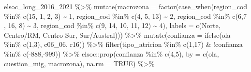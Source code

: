 \documentclass[
  12pt,
]{book}
\newenvironment{Shaded}{\begin{snugshade}}{\end{snugshade}}
\newcommand{\AttributeTok}[1]{\textcolor[rgb]{0.77,0.63,0.00}{#1}}
\newcommand{\ConstantTok}[1]{\textcolor[rgb]{0.00,0.00,0.00}{#1}}
\newcommand{\DecValTok}[1]{\textcolor[rgb]{0.00,0.00,0.81}{#1}}
\newcommand{\FunctionTok}[1]{\textcolor[rgb]{0.00,0.00,0.00}{#1}}
\newcommand{\NormalTok}[1]{#1}
\newcommand{\SpecialCharTok}[1]{\textcolor[rgb]{0.00,0.00,0.00}{#1}}
\newcommand{\StringTok}[1]{\textcolor[rgb]{0.31,0.60,0.02}{#1}}
\begin{document}
\begin{Shaded}
\begin{Highlighting}[]
\NormalTok{elsoc\_long\_2016\_2021 }\SpecialCharTok{\%\textgreater{}\%} 
  \FunctionTok{mutate}\NormalTok{(}\AttributeTok{macrozona =} \FunctionTok{factor}\NormalTok{(}\FunctionTok{case\_when}\NormalTok{(region\_cod }\SpecialCharTok{\%in\%} \FunctionTok{c}\NormalTok{(}\DecValTok{15}\NormalTok{, }\DecValTok{1}\NormalTok{, }\DecValTok{2}\NormalTok{, }\DecValTok{3}\NormalTok{) }\SpecialCharTok{\textasciitilde{}} \DecValTok{1}\NormalTok{,}
\NormalTok{                               region\_cod }\SpecialCharTok{\%in\%} \FunctionTok{c}\NormalTok{(}\DecValTok{4}\NormalTok{, }\DecValTok{5}\NormalTok{, }\DecValTok{13}\NormalTok{) }\SpecialCharTok{\textasciitilde{}} \DecValTok{2}\NormalTok{,}
\NormalTok{                               region\_cod }\SpecialCharTok{\%in\%} \FunctionTok{c}\NormalTok{(}\DecValTok{6}\NormalTok{,}\DecValTok{7}\NormalTok{ , }\DecValTok{16}\NormalTok{, }\DecValTok{8}\NormalTok{) }\SpecialCharTok{\textasciitilde{}} \DecValTok{3}\NormalTok{,}
\NormalTok{                               region\_cod }\SpecialCharTok{\%in\%} \FunctionTok{c}\NormalTok{(}\DecValTok{9}\NormalTok{, }\DecValTok{14}\NormalTok{, }\DecValTok{10}\NormalTok{, }\DecValTok{11}\NormalTok{, }\DecValTok{12}\NormalTok{) }\SpecialCharTok{\textasciitilde{}} \DecValTok{4}\NormalTok{),}
                            \AttributeTok{labels =} \FunctionTok{c}\NormalTok{(}\StringTok{\textquotesingle{}Norte\textquotesingle{}}\NormalTok{, }\StringTok{\textquotesingle{}Centro/RM\textquotesingle{}}\NormalTok{, }\StringTok{\textquotesingle{}Centro Sur\textquotesingle{}}\NormalTok{, }\StringTok{\textquotesingle{}Sur/Austral\textquotesingle{}}\NormalTok{))) }\SpecialCharTok{\%\textgreater{}\%} 
  \FunctionTok{mutate}\NormalTok{(}\AttributeTok{confianza =} \FunctionTok{ifelse}\NormalTok{(ola }\SpecialCharTok{\%in\%} \FunctionTok{c}\NormalTok{(}\DecValTok{1}\NormalTok{,}\DecValTok{3}\NormalTok{), c06\_06, r16)) }\SpecialCharTok{\%\textgreater{}\%} 
  \FunctionTok{filter}\NormalTok{(tipo\_atricion }\SpecialCharTok{\%in\%} \FunctionTok{c}\NormalTok{(}\DecValTok{1}\NormalTok{,}\DecValTok{17}\NormalTok{) }\SpecialCharTok{\&} \SpecialCharTok{!}\NormalTok{confianza }\SpecialCharTok{\%in\%} \FunctionTok{c}\NormalTok{(}\SpecialCharTok{{-}}\DecValTok{888}\NormalTok{,}\SpecialCharTok{{-}}\DecValTok{999}\NormalTok{)) }\SpecialCharTok{\%\textgreater{}\%} 
\NormalTok{  elsoc}\SpecialCharTok{::}\FunctionTok{prop}\NormalTok{(confianza }\SpecialCharTok{\%in\%} \FunctionTok{c}\NormalTok{(}\DecValTok{4}\NormalTok{,}\DecValTok{5}\NormalTok{), }\AttributeTok{by =} \FunctionTok{c}\NormalTok{(ola, cuestion\_mig, macrozona), }\AttributeTok{na.rm =} \ConstantTok{TRUE}\NormalTok{) }\SpecialCharTok{\%\textgreater{}\%} 

\end{Highlighting}
\end{Shaded}
\end{document}
